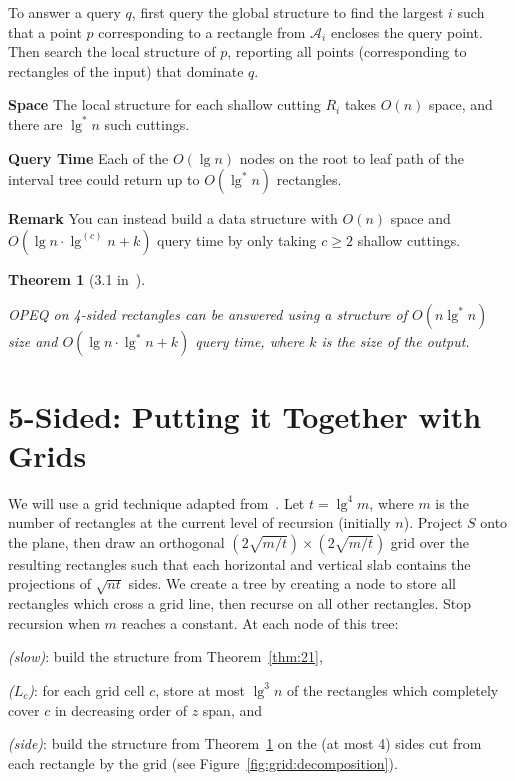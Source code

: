 \documentclass[letterpaper,12pt,twocolumn]{article}
\newcommand\lspace{\hspace{-0.5em}}
\newcommand{\BigOh}[1]{O\!\left(#1\right)}
\theoremstyle{plain}
\newtheorem{theorem}{Theorem}
\begin{document}
To answer a query $q$, first query the global structure to find the
largest $i$ such that a point $p$ corresponding to a rectangle from
$\mathcal{A}_i$ encloses the query point.  Then search the local
structure of $p$, reporting all points (corresponding to rectangles of
the input) that dominate $q$.

\textbf{Space} The local structure for each shallow cutting $R_i$
takes $\BigOh{n}$ space, and there are $\lg^* n$ such cuttings.

\textbf{Query Time} Each of the $\BigOh{\lg n}$ nodes on the root to
leaf path of the interval tree could return up to $\BigOh{\lg^* n}$
rectangles.

\textbf{Remark} You can instead build a data structure with
$\BigOh{n}$ space and $\BigOh{\lg n\cdot\lg^{(c)}n + k}$ query time by only
taking $c \ge 2$ shallow cuttings.

\begin{theorem}[3.1 in~\cite{saladi2015improved}]\label{thm:31}

  OPEQ on 4-sided rectangles can be answered using a structure of
  $\BigOh{n\lg^* n}$ size and $\BigOh{\lg n \cdot \lg^* n + k}$
  query time, where $k$ is the size of the output.

\end{theorem}

\section{\lspace{} 5-Sided: Putting it Together with Grids}
\label{sec:5sided}

We will use a grid technique adapted from~\cite{alstrup2000new}.  Let
$t = \lg^4 m$, where $m$ is the number of rectangles at the current
level of recursion (initially $n$).  Project $S$ onto the plane, then
draw an orthogonal $(2\sqrt{m/t})\times(2\sqrt{m/t})$ grid over the
resulting rectangles such that each horizontal and vertical slab
contains the projections of $\sqrt{nt}$ sides.  We create a tree by
creating a node to store all rectangles which cross a grid line, then
recurse on all other rectangles.  Stop recursion when $m$ reaches a
constant.  At each node of this tree:
%
\begin{enumerate*}[label=(\roman*)] %
\item \emph{(slow)}: build the structure from Theorem~\ref{thm:21},
\item \emph{($L_c$)}: for each grid cell $c$, store at most $\lg^3 n$
  of the rectangles which completely cover $c$ in decreasing order of
  $z$ span, and
\item \emph{(side)}: build the structure from Theorem~\ref{thm:31} on
  the (at most 4) sides cut from each rectangle by the grid (see
  Figure~\ref{fig:grid:decomposition}).
\end{enumerate*}
\end{document}
